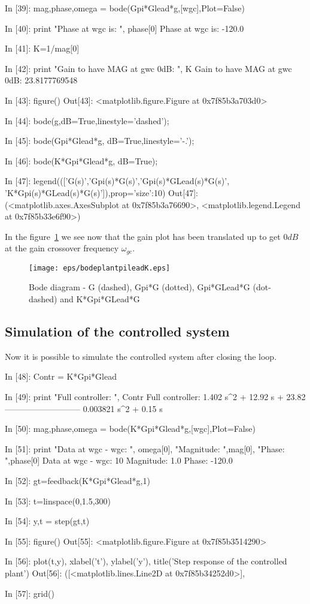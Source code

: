 \begin{code}
In [39]: mag,phase,omega = bode(Gpi*Glead*g,[wgc],Plot=False)

In [40]: print "Phase at wgc is: ", phase[0]
Phase at wgc is:  -120.0

In [41]: K=1/mag[0]

In [42]: print "Gain to have MAG at gwc 0dB: ", K
Gain to have MAG at gwc 0dB:  23.8177769548

In [43]: figure()
Out[43]: <matplotlib.figure.Figure at 0x7f85b3a703d0>

In [44]: bode(g,dB=True,linestyle='dashed');

In [45]: bode(Gpi*Glead*g, dB=True,linestyle='-.');

In [46]: bode(K*Gpi*Glead*g, dB=True);

In [47]: 
legend((['G(s)','Gpi(s)*G(s)','Gpi(s)*GLead(s)*G(s)',
'K*Gpi(s)*GLead(s)*G(s)']),prop={'size':10})
Out[47]: 
(<matplotlib.axes.AxesSubplot at 0x7f85b3a76690>,
 <matplotlib.legend.Legend at 0x7f85b33e6f90>)
\end{code}

In the figure~\ref{F13} we see now that the gain plot has been translated up to 
get $0dB$ at the gain crossover frequency $\omega_{gc}$.

\begin{figure}[htbp]	%
\centering
\texttt{[image: eps/bodeplantpileadK.eps]}
\caption{Bode diagram - G (dashed), Gpi*G (dotted), Gpi*GLead*G (dot-dashed) 
and K*Gpi*GLead*G}
\label{F13}
\end{figure}

\subsection{Simulation of the controlled system}

Now it is possible to simulate the controlled system after closing the loop.

\begin{code}
In [48]: Contr = K*Gpi*Glead

In [49]: print "Full controller: ", Contr
Full controller:  
1.402 s^2 + 12.92 s + 23.82
---------------------------
   0.003821 s^2 + 0.15 s

In [50]: mag,phase,omega = bode(K*Gpi*Glead*g,[wgc],Plot=False)

In [51]: print "Data at wgc - wgc: ", omega[0], "Magnitude: ",mag[0], "Phase: 
",phase[0]
Data at wgc - wgc:  10 Magnitude:  1.0 Phase:  -120.0

In [52]: gt=feedback(K*Gpi*Glead*g,1)

In [53]: t=linspace(0,1.5,300)

In [54]: y,t = step(gt,t)

In [55]: figure()
Out[55]: <matplotlib.figure.Figure at 0x7f85b3514290>

In [56]: plot(t,y), xlabel('t'), ylabel('y'), title('Step response of the 
controlled plant')
Out[56]: 
([<matplotlib.lines.Line2D at 0x7f85b34252d0>],

In [57]: grid()
\end{code}

